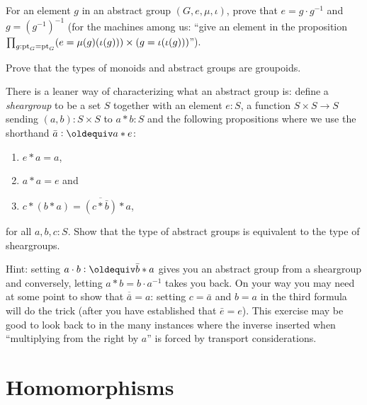   \begin{xca}
    For an element $g$ in an abstract group $(G,e,\mu,\iota)$, prove that $e=g\cdot g^{-1}$ and $g=(g^{-1})^{-1}$ (for the machines among us: ``give an element in the proposition
$\prod_{g:{\mathord{\mathrm{pt}}}_G={\mathord{\mathrm{pt}}}_G}
(e=\mu{}(g)(\iota{}(g)))\times
(g=\iota{}(\iota{}(g)))$'').
  \end{xca}
  \begin{xca}\label{xca:typemonoidisgroupoid}
    Prove that the types of monoids and abstract groups are groupoids.
  \end{xca}
  \begin{xca}
    \label{xca:cheapgroup}
    There is a leaner way of characterizing what an abstract group is: define a \emph{sheargroup} to be a set $S$ together with an element $e:S$, a function $S\times S\to S$ sending $(a,b):S\times S$ to $a*b:S$ and the following propositions where we use the shorthand $\bar a\defequi a*e$:
    \begin{enumerate}
    \item $e*a=a$,
    \item $a*a=e$ and
    \item $c*(b*a)=\overline{(c*\bar b)}*a$,
    \end{enumerate}
    for all $a,b,c:S$.
    Show that the type of abstract groups is equivalent to the type of sheargroups.  

Hint: setting $a\cdot b\defequi \bar b*a$ gives you an abstract group from a sheargroup and conversely, letting $a*b=b\cdot a^{-1}$ takes you back.  On your way you may need at some point to show that $\overline{\bar a}=a$: setting $c=\bar a$ and $b=a$ in the third formula will do the trick (after you have established that $\bar e=e$).  This exercise may be good to look back to in the many instances where the inverse inserted when ``multiplying from the right by $a$'' is forced by transport considerations. 
  \end{xca}




\section{Homomorphisms}
\label{sec:homomorphisms}


